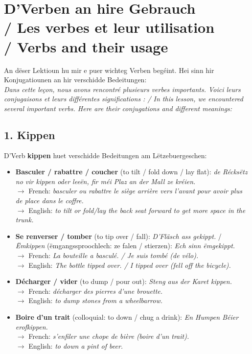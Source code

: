 \section[D'Verben an hire Gebrauch / Verbes / Verbs]{D'Verben an hire Gebrauch \\/ Les verbes et leur utilisation \\/ Verbs and their usage}

An dëser Lektioun hu mir e puer wichteg Verben begéint. Hei sinn hir Konjugatiounen an hir verschidde Bedeitungen: \\
\textit{Dans cette leçon, nous avons rencontré plusieurs verbes importants. Voici leurs conjugaisons et leurs différentes significations : / In this lesson, we encountered several important verbs. Here are their conjugations and different meanings:}

\subsection*{1. Kippen}
D'Verb \textbf{kippen} huet verschidde Bedeitungen am Lëtzebuergeschen:
\begin{itemize}
    \item \textbf{Basculer / rabattre / coucher} (to tilt / fold down / lay flat): \textit{de Récksëtz no vir kippen oder leeën, fir méi Plaz an der Mall ze kréien.} \\
    $\rightarrow$ French: \textit{basculer ou rabattre le siège arrière vers l'avant pour avoir plus de place dans le coffre.} \\
    $\rightarrow$ English: \textit{to tilt or fold/lay the back seat forward to get more space in the trunk.}
    
    \item \textbf{Se renverser / tomber} (to tip over / fall): \textit{D'Fläsch ass gekippt.} / \textit{Ëmkippen} (ëmgangssproochlech: ze falen / stierzen): \textit{Ech sinn ëmgekippt.} \\
    $\rightarrow$ French: \textit{La bouteille a basculé. / Je suis tombé (de vélo).} \\
    $\rightarrow$ English: \textit{The bottle tipped over. / I tipped over (fell off the bicycle).}
    
    \item \textbf{Décharger / vider} (to dump / pour out): \textit{Steng aus der Karet kippen.} \\
    $\rightarrow$ French: \textit{décharger des pierres d'une brouette.} \\
    $\rightarrow$ English: \textit{to dump stones from a wheelbarrow.}
    
    \item \textbf{Boire d'un trait} (colloquial: to down / chug a drink): \textit{En Humpen Béier erofkippen.} \\
    $\rightarrow$ French: \textit{s'enfiler une chope de bière (boire d'un trait).} \\
    $\rightarrow$ English: \textit{to down a pint of beer.}
\end{itemize}

